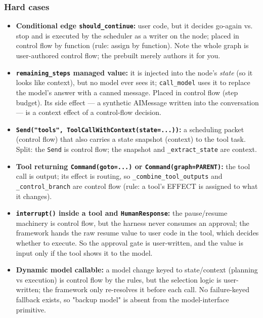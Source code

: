 \subsubsection*{Hard cases}
\begin{itemize}
\item \textbf{Conditional edge \texttt{should\_\allowbreak{}continue}:} user code, but it decides go-again vs. stop and is executed by the scheduler as a writer on the node; placed in control flow by function (rule: assign by function). Note the whole graph is user-authored control flow; the prebuilt merely authors it for you.
\item \textbf{\texttt{remaining\_\allowbreak{}steps} managed value:} it is injected into the node's \emph{state} (so it looks like context), but no model ever sees it; \texttt{call\_\allowbreak{}model} uses it to replace the model's answer with a canned message. Placed in control flow (step budget). Its side effect --- a synthetic AIMessage written into the conversation --- is a context effect of a control-flow decision.
\item \textbf{\texttt{Send(\allowbreak{}"tools", ToolCallWithContext(\allowbreak{}state=.\allowbreak{}.\allowbreak{}.\allowbreak{}))}:} a scheduling packet (control flow) that also carries a state snapshot (context) to the tool task. Split: the \texttt{Send} is control flow; the snapshot and \texttt{\_\allowbreak{}extract\_\allowbreak{}state} are context.
\item \textbf{Tool returning \texttt{Command(\allowbreak{}goto=.\allowbreak{}.\allowbreak{}.\allowbreak{})} or \texttt{Command(\allowbreak{}graph=PARENT)}:} the tool call is output; its effect is routing, so \texttt{\_\allowbreak{}combine\_\allowbreak{}tool\_\allowbreak{}outputs} and \texttt{\_\allowbreak{}control\_\allowbreak{}branch} are control flow (rule: a tool's EFFECT is assigned to what it changes).
\item \textbf{\texttt{interrupt(\allowbreak{})} inside a tool and \texttt{HumanResponse}:} the pause/resume machinery is control flow, but the harness never consumes an approval; the framework hands the raw resume value to user code in the tool, which decides whether to execute. So the approval gate is user-written, and the value is input only if the tool shows it to the model.
\item \textbf{Dynamic model callable:} a model change keyed to state/context (planning vs execution) is control flow by the rules, but the selection logic is user-written; the framework only re-resolves it before each call. No failure-keyed fallback exists, so "backup model" is absent from the model-interface primitive.

\end{itemize}
